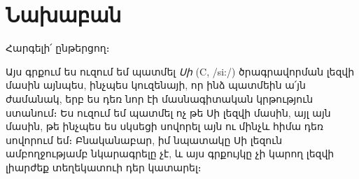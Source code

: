 \chapter*{Նախաբան}

Հարգելի՛ ընթերցող։

Այս գրքում ես ուզում եմ պատմել \emph{Սի} (C, /si:/) ծրագրավորման լեզվի 
մասին այնպես, ինչպես կուզենայի, որ ինձ պատմեին ա՛յն ժամանակ, երբ ես դեռ 
նոր էի մասնագիտական կրթություն ստանում։ Ես ուզում եմ պատմել ոչ թե Սի 
լեզվի մասին, այլ այն մասին, թե ինչպես ես սկսեցի սովորել այն ու մինչև հիմա 
դեռ սովորում եմ։ Բնականաբար, իմ նպատակը Սի լեզուն ամբողջությամբ նկարագրելը 
չէ, և այս գրքույկը չի կարող լեզվի լիարժեք տեղեկատուի դեր կատարել։
